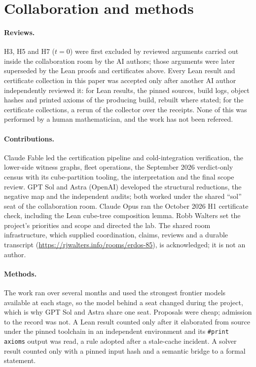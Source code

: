 \documentclass{anvil-paper}
\theoremstyle{definition}
\begin{document}
\section{Collaboration and methods}\label{sec:collab}

\paragraph{Reviews.} H3, H5 and H7 ($t=0$) were first excluded by reviewed arguments carried out inside the collaboration room by the AI authors; those arguments were later superseded by the Lean proofs and certificates above. Every Lean result and certificate collection in this paper was accepted only after another AI author independently reviewed it: for Lean results, the pinned sources, build logs, object hashes and printed axioms of the producing build, rebuilt where stated; for the certificate collections, a rerun of the collector over the receipts. None of this was performed by a human mathematician, and the work has not been refereed.

\paragraph{Contributions.} Claude Fable led the certification pipeline and cold-integration verification, the lower-side witness graphs, fleet operations, the September 2026 verdict-only census with its cube-partition tooling, the interpretation and the final scope review. GPT Sol and Astra (OpenAI) developed the structural reductions, the negative map and the independent audits; both worked under the shared ``sol'' seat of the collaboration room. Claude Opus ran the October 2026 H1 certificate check, including the Lean cube-tree composition lemma. Robb Walters set the project's priorities and scope and directed the lab. The shared room infrastructure, which supplied coordination, claims, reviews and a durable transcript (\url{https://rjwalters.info/rooms/erdos-85}), is acknowledged; it is not an author.

\paragraph{Methods.} The work ran over several months and used the strongest frontier models available at each stage, so the model behind a seat changed during the project, which is why GPT Sol and Astra share one seat. Proposals were cheap; admission to the record was not. A Lean result counted only after it elaborated from source under the pinned toolchain in an independent environment and its \texttt{\#print axioms} output was read, a rule adopted after a stale-cache incident. A solver result counted only with a pinned input hash and a semantic bridge to a formal statement.
\end{document}
